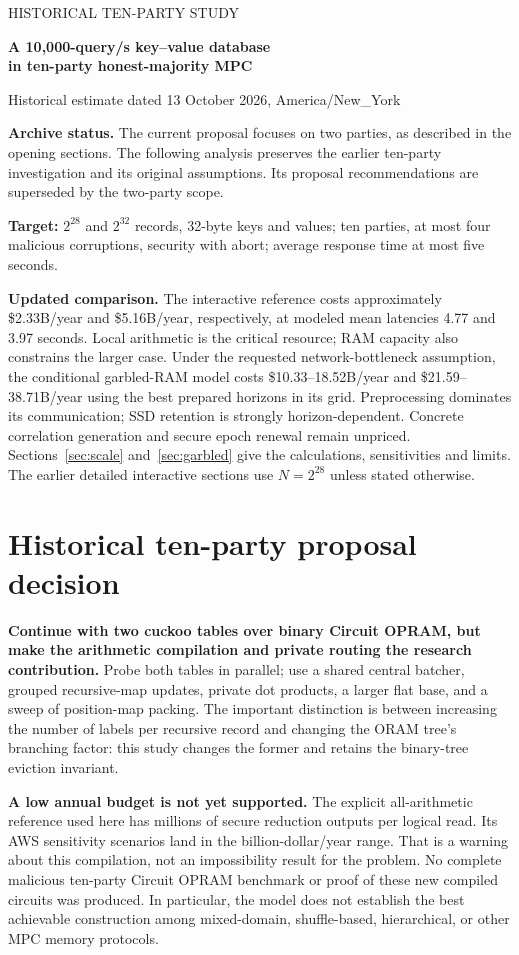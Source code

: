 \documentclass[11pt]{article}
\begin{document}

\clearpage
{\color{teal}\large HISTORICAL TEN-PARTY STUDY}\par
{\color{navy}\LARGE\bfseries A 10,000-query/s key--value database\\in ten-party honest-majority MPC}\par
Historical estimate dated 13 October 2026, America/New\_York\par
\textbf{Archive status.} The current proposal focuses on two parties, as
described in the opening sections. The following analysis preserves the
earlier ten-party investigation and its original assumptions. Its proposal
recommendations are superseded by the two-party scope.\par
\textbf{Target:} $2^{28}$ and $2^{32}$ records, 32-byte keys and values; ten parties, at most four
malicious corruptions, security with abort; average response time at most five seconds.

\textbf{Updated comparison.} The interactive reference costs approximately
\$2.33B/year and \$5.16B/year, respectively, at modeled mean latencies 4.77 and
3.97 seconds. Local arithmetic is the critical resource; RAM capacity also
constrains the larger case. Under the requested network-bottleneck assumption,
the conditional garbled-RAM model costs \$10.33--18.52B/year and \$21.59--38.71B/year using the
best prepared horizons in its grid. Preprocessing dominates its communication;
SSD retention is strongly horizon-dependent. Concrete correlation generation and
secure epoch renewal remain unpriced. Sections~\ref{sec:scale}
and~\ref{sec:garbled} give the calculations, sensitivities and limits.
The earlier detailed interactive sections use $N=2^{28}$ unless stated otherwise.

\section{Historical ten-party proposal decision}
\textbf{Continue with two cuckoo tables over binary Circuit OPRAM, but make the
arithmetic compilation and private routing the research contribution.} Probe both
tables in parallel; use a shared central batcher, grouped recursive-map updates,
private dot products, a larger flat base, and a sweep of position-map packing.
The important distinction is between increasing the number of labels per
recursive record and changing the ORAM tree's branching factor: this study changes
the former and retains the binary-tree eviction invariant.

\textbf{A low annual budget is not yet supported.} The explicit all-arithmetic
reference used here has millions of secure reduction outputs per logical read.
Its AWS sensitivity scenarios land in the billion-dollar/year range. That is a
warning about this compilation, not an impossibility result for the problem.
No complete malicious ten-party Circuit OPRAM benchmark or proof of these new
compiled circuits was produced. In particular, the model does not establish the
best achievable construction among mixed-domain, shuffle-based, hierarchical, or
other MPC memory protocols.
\end{document}
